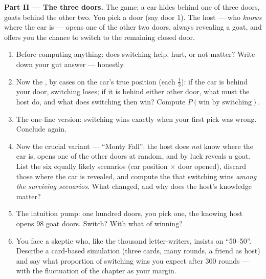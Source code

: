 \begin{problem}
\medskip
\noindent\textbf{Part II --- The three doors.}
The game: a car hides behind one of three doors, goats behind
the other two. You pick a door (say door 1). The host --- who
\emph{knows} where the car is --- opens one of the other two
doors, always revealing a goat, and offers you the chance to
switch to the remaining closed door.
\begin{enumerate}[resume]
  \item Before computing anything: does switching help, hurt, or
        not matter? Write down your gut answer --- honestly.
  \item Now the , by cases on the car's true position
        (each $\frac13$): if the car is behind your door,
        switching loses; if it is behind either other door, what
        must the host do, and what does switching then win?
        Compute $P(\text{win by switching})$.
  \item The one-line version: switching wins exactly when your
        first pick was wrong. Conclude again.
  \item Now the crucial variant --- ``Monty Fall'': the host
        does \emph{not} know where the car is, opens one of the
        other doors at random, and by luck reveals a goat. List
        the six equally likely scenarios (car position $\times$
        door opened), discard those where the car is revealed,
        and compute the  that switching wins
        \emph{among the surviving scenarios}. What changed, and
        why does the host's knowledge matter?
  \item The intuition pump: one hundred doors, you pick one, the
        knowing host opens $98$ goat doors. Switch? With what
         of winning?
  \item You face a skeptic who, like the thousand letter-writers,
        insists on ``50--50''. Describe a card-based simulation
        (three cards, many rounds, a friend as host) and say
        what proportion of switching wins you expect after $300$
        rounds --- with the fluctuation  of the chapter
        as your margin.
\end{enumerate}


\end{problem}
